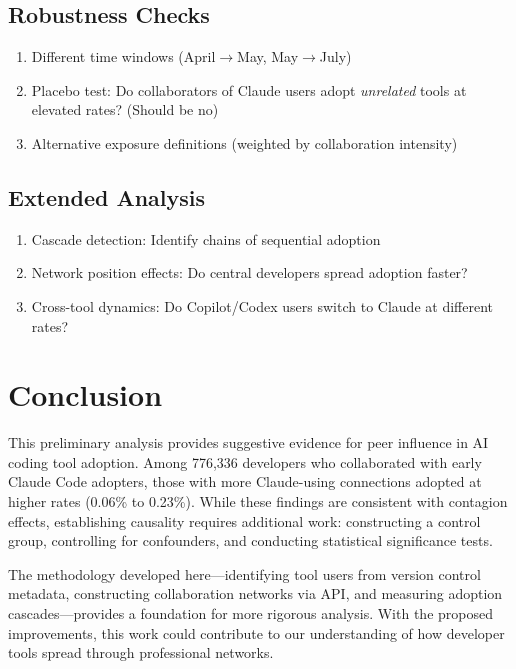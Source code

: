 \documentclass[11pt]{article}
\begin{document}
\subsection{Robustness Checks}

\begin{enumerate}
    \item Different time windows (April$\to$May, May$\to$July)
    \item Placebo test: Do collaborators of Claude users adopt \textit{unrelated} tools at elevated rates? (Should be no)
    \item Alternative exposure definitions (weighted by collaboration intensity)
\end{enumerate}

\subsection{Extended Analysis}

\begin{enumerate}
    \item Cascade detection: Identify chains of sequential adoption
    \item Network position effects: Do central developers spread adoption faster?
    \item Cross-tool dynamics: Do Copilot/Codex users switch to Claude at different rates?
\end{enumerate}

\section{Conclusion}

This preliminary analysis provides suggestive evidence for peer influence in AI coding tool adoption. Among 776,336 developers who collaborated with early Claude Code adopters, those with more Claude-using connections adopted at higher rates (0.06\% to 0.23\%). While these findings are consistent with contagion effects, establishing causality requires additional work: constructing a control group, controlling for confounders, and conducting statistical significance tests.

The methodology developed here---identifying tool users from version control metadata, constructing collaboration networks via API, and measuring adoption cascades---provides a foundation for more rigorous analysis. With the proposed improvements, this work could contribute to our understanding of how developer tools spread through professional networks.
\end{document}
